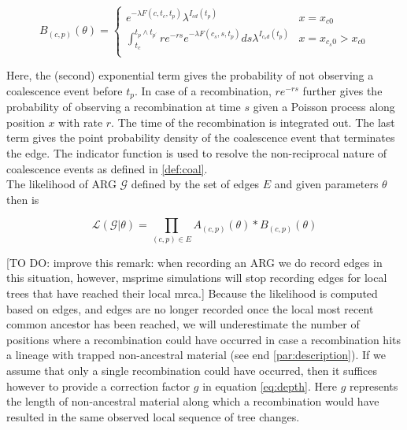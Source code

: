 \documentclass{article}
\begin{document}
\begin{equation}\label{eq:depth}
B_{(c, p)}(\theta) = \begin{cases}
e^{-\lambda F(c, t_c, t_p)} \lambda^{I_{cd}(t_p)} & x=x_{c0} \\
\int_{t_c}^{t_{p} \wedge t_{p^{\prime}}} r e^{-rs} e^{-\lambda F(c_s, s, t_{p})} ds \lambda^{I_{c_{s}d}(t_p)} & x=x_{c_{s}0}>x_{c0} \\
\end{cases}
\end{equation}

Here, the (second) exponential term gives the probability of not observing a 
coalescence event before $t_p$. In case of a recombination, $re^{-rs}$ further 
gives the probability of observing a recombination 
at time $s$ given a Poisson process along position $x$ with rate $r$. The 
time of the recombination is integrated out.
The last term gives the point probability density of the coalescence event 
that terminates the edge. The indicator function is used to resolve 
the non-reciprocal nature of coalescence events as defined in \ref{def:coal}.\\

The likelihood of ARG $\mathcal{G}$ defined by the set of edges $E$ and
given parameters $\theta$ then is

\begin{equation}\label{eq:full-lik}
\mathcal{L}(\mathcal{G}|\theta) = \prod_{(c, p) \in E} A_{(c, p)}(\theta) * B_{(c, p)}(\theta)
\end{equation}


[TO DO: improve this remark: when recording an ARG we do record edges in this situation,
however, msprime simulations will stop recording edges for local trees that have reached 
their local mrca.] 
Because the likelihood is computed based on edges,
and edges are no longer recorded once the local most recent common ancestor 
has been reached, we will underestimate the number of positions where 
a recombination could have occurred in case a recombination hits a 
lineage with trapped non-ancestral material (see end \ref{par:description}). 
If we assume that only a single recombination could have  
occurred, then it suffices however to provide a correction factor $g$ in equation
\ref{eq:depth}. Here $g$ represents the 
length of non-ancestral material along which a recombination would have resulted  
in the same observed local sequence of tree changes.\\
\end{document}

